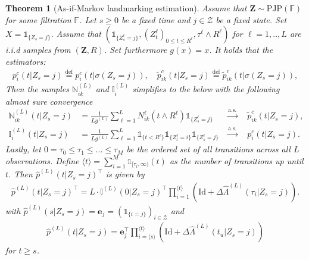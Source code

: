 \documentclass[12pt,letter,twoside]{article}
\theoremstyle{plain}
\newtheorem{theorem}{Theorem}
\theoremstyle{definition}
\theoremstyle{remark}
\begin{document}
\begin{theorem}[As-if-Markov landmarking estimation]\label{thm:2}
Assume that $\mathbf Z\sim\text{PJP}(\mathbb F)$ for some filtration $\mathbb F$. Let $s\ge 0$ be a fixed time and $j\in\mathcal Z$ be a fixed state. Set $X=\mathds 1_{\{Z_s=j\}}$. Assume that $(\mathds 1_{\{Z_s^\ell=j\}},(Z_t^\ell)_{0\le t\le R^\ell},\tau^\ell\wedge R^\ell)$ for $\ell = 1,..,L$ are i.i.d samples from $(\mathbf Z,R)$. Set furthermore $g(x)=x$.
It holds that the estimators:
\begin{align}
p^c_i(t\vert Z_s=j)\stackrel{\text{def}}{=}p^c_i(t\vert \sigma(Z_s=j)),\quad \tilde p^c_{ik}(t\vert Z_s=j)\stackrel{\text{def}}{=}\tilde p^c_{ik}(t\vert \sigma(Z_s=j)),
\end{align}
Then the samples $\mathbb N^{(L)}_{ik}$ and $\mathbb I^{(L)}_{i}$ simplifies to the below with the following almost sure convergence
\begin{align}
\mathbb N^{(L)}_{ik}(t\vert Z_s=j)&=\frac{1}{Lg^{(L)}}\sum_{\ell = 1}^L N^\ell_{ik}(t\wedge R^\ell)\mathds 1_{\{Z_s^\ell=j\}}&\stackrel{\text{a.s.}}{\to}\quad\tilde p^c_{ik}(t\vert Z_s=j),\label{thm:2eq:1}\\
\mathbb I^{(L)}_{i}(t\vert Z_s=j)&=\frac{1}{Lg^{(L)}}\sum_{\ell = 1}^L \mathds 1_{\{t<R^\ell\}}\mathds 1_{\{Z_t^\ell = i\}}\mathds 1_{\{Z_s^\ell=j\}}&\stackrel{\text{a.s.}}{\to}\quad p^c_{i}(t\vert Z_s=j).\label{thm:2eq:2}
\end{align}
Lastly, let $0=\tau_0\le \tau_1\le ...\le \tau_M$ be the ordered set of all transitions across all $L$ observations. Define $\langle t\rangle = \sum_{i=1}^M\mathds 1_{[\tau_i,\infty)}(t)$ as the number of transitions up until $t$. Then $\hat p^{(L)}(t\vert Z_s=j)^\top$ is given by
\begin{align}
\hat p^{(L)}(t\vert Z_s=j)^\top=L\cdot \mathbb I^{(L)}(0\vert Z_s=j)^\top \prod_{i=1}^{\langle t\rangle }\left(\text{Id} + \Delta \hat \Lambda^{(L)}(\tau_i\vert Z_s=j) \right).\label{eq:5}
\end{align}
with $\hat p^{(L)}(s\vert Z_s=j)=\mathbf e_j=(\mathds 1_{\{i=j\}})_{i\in\mathcal Z}$ and
\begin{align}
\hat p ^{(L)}(t\vert Z_s=j)=\mathbf e_j^\top\prod_{i=\langle s\rangle}^{\langle t\rangle }\left(\text{Id} + \Delta \hat \Lambda^{(L)}(t_u\vert Z_s=j) \right)
\end{align}
for $t\ge s$.
\end{theorem}
\end{document}
